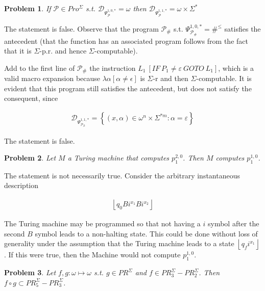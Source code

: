 \documentclass[a4paper, 12pt]{article}
\newtheorem{problem}{Problem}
\newtheorem{problem}{Problem}
\begin{document}
\begin{problem}
    If $\mathcal{P} \in Pro^{\Sigma}$ s.t. $\mathcal{D}_{\Psi_{\mathcal{P}}^{1,
    0, *}} = \omega$ then $\mathcal{D}_{\Psi_{\mathcal{P}}^{1, 1, *}} = \omega
    \times \Sigma^{*}$
\end{problem}

The statement is false. Observe that the program $\mathcal{P}_{\#}$  s.t.
$\Psi_{\mathcal{P}_{\#}}^{1, 0, *} = \#^{\leq}$ satisfies the antecedent (that
the function has an associated program follows from the fact that it is
$\Sigma$-p.r. and hence $\Sigma$-computable).


Add to the first line of $\mathcal{P}_{\#}$ the instruction $L_1 ~ [ IF ~ P_1
\neq \varepsilon ~ GOTO ~ L_1]$, which is a valid macro expansion because
$\lambda \alpha \left[ \alpha \neq \epsilon  \right]$ is $\Sigma$-r and then
$\Sigma$-computable. It is evident that this program still satisfies the
antecedent, but does not satisfy the consequent, since 

\begin{align*}
    \mathcal{D}_{\Psi_{\mathcal{P}_\#}^{1, 1, *}} = \left\{ (x, \alpha) \in
    \omega^{n} \times \Sigma^{*m}  : \alpha = \varepsilon  \right\} 
\end{align*}

The statement is false.

\begin{problem}
    Let $M$ a Turing machine that computes $p_1^{2, 0}$. Then $M$ computes
    $p_1^{1, 0}$.
\end{problem}

The statement is not necessarily true. Consider the arbitrary instantaneous
description 

\begin{align*}
    \left\lfloor q_0 B i^{x_1} B i^{x_2} \right\rfloor
\end{align*}

The Turing machine may be programmed so that not having a $i$ symbol after the
second $B$ symbol leads to a non-halting state. This could be done without loss
of generality under the assumption that the Turing machine leads to a state
$\left\lfloor q_f i^{x_1} \right\rfloor$. If this were true, then the Machine
would not compute $p_1^{1, 0}$.

\begin{problem}
    Let $f, g : \omega \mapsto \omega$ s.t. $g \in PR^{\Sigma}$ and $f \in
    PR_3^{\Sigma} - PR_2^{\Sigma}$. Then $f \circ g \subset PR_5^{\Sigma} -
    PR_3^{\Sigma}$.
\end{problem}
\end{document}
